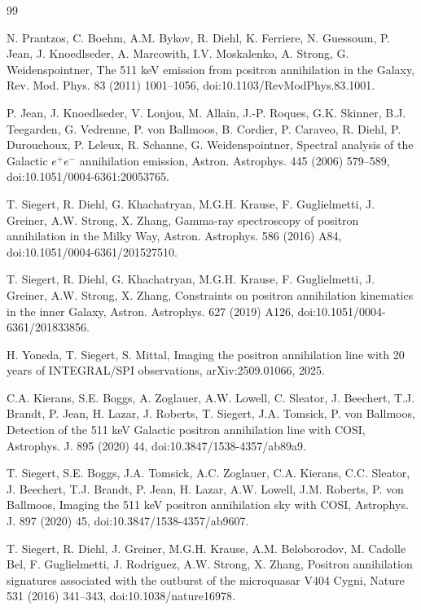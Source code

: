 \documentclass[preprint,12pt]{elsarticle}
\begin{document}
\FloatBarrier
\begin{thebibliography}{99}

N. Prantzos, C. Boehm, A.M. Bykov, R. Diehl, K. Ferriere, N. Guessoum, P. Jean, J. Knoedlseder, A. Marcowith, I.V. Moskalenko, A. Strong, G. Weidenspointner, The 511 keV emission from positron annihilation in the Galaxy, Rev. Mod. Phys. 83 (2011) 1001--1056, doi:10.1103/RevModPhys.83.1001.

P. Jean, J. Knoedlseder, V. Lonjou, M. Allain, J.-P. Roques, G.K. Skinner, B.J. Teegarden, G. Vedrenne, P. von Ballmoos, B. Cordier, P. Caraveo, R. Diehl, P. Durouchoux, P. Leleux, R. Schanne, G. Weidenspointner, Spectral analysis of the Galactic $e^+e^-$ annihilation emission, Astron. Astrophys. 445 (2006) 579--589, doi:10.1051/0004-6361:20053765.

T. Siegert, R. Diehl, G. Khachatryan, M.G.H. Krause, F. Guglielmetti, J. Greiner, A.W. Strong, X. Zhang, Gamma-ray spectroscopy of positron annihilation in the Milky Way, Astron. Astrophys. 586 (2016) A84, doi:10.1051/0004-6361/201527510.

T. Siegert, R. Diehl, G. Khachatryan, M.G.H. Krause, F. Guglielmetti, J. Greiner, A.W. Strong, X. Zhang, Constraints on positron annihilation kinematics in the inner Galaxy, Astron. Astrophys. 627 (2019) A126, doi:10.1051/0004-6361/201833856.

H. Yoneda, T. Siegert, S. Mittal, Imaging the positron annihilation line with 20 years of INTEGRAL/SPI observations, arXiv:2509.01066, 2025.

C.A. Kierans, S.E. Boggs, A. Zoglauer, A.W. Lowell, C. Sleator, J. Beechert, T.J. Brandt, P. Jean, H. Lazar, J. Roberts, T. Siegert, J.A. Tomsick, P. von Ballmoos, Detection of the 511 keV Galactic positron annihilation line with COSI, Astrophys. J. 895 (2020) 44, doi:10.3847/1538-4357/ab89a9.

T. Siegert, S.E. Boggs, J.A. Tomsick, A.C. Zoglauer, C.A. Kierans, C.C. Sleator, J. Beechert, T.J. Brandt, P. Jean, H. Lazar, A.W. Lowell, J.M. Roberts, P. von Ballmoos, Imaging the 511 keV positron annihilation sky with COSI, Astrophys. J. 897 (2020) 45, doi:10.3847/1538-4357/ab9607.

T. Siegert, R. Diehl, J. Greiner, M.G.H. Krause, A.M. Beloborodov, M. Cadolle Bel, F. Guglielmetti, J. Rodriguez, A.W. Strong, X. Zhang, Positron annihilation signatures associated with the outburst of the microquasar V404 Cygni, Nature 531 (2016) 341--343, doi:10.1038/nature16978.


\end{thebibliography}
\end{document}
